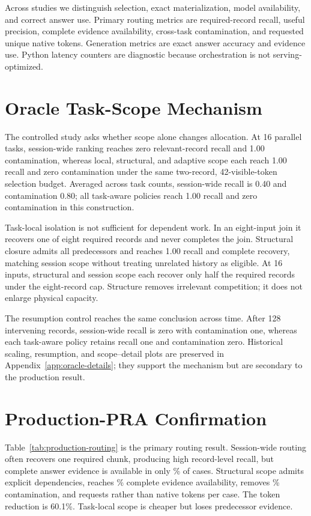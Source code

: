 \documentclass[10pt]{article}
\begin{document}
Across studies we distinguish selection, exact materialization, model availability, and correct answer use. Primary routing metrics are required-record recall, useful precision, complete evidence availability, cross-task contamination, and requested unique native tokens. Generation metrics are exact answer accuracy and evidence use. Python latency counters are diagnostic because orchestration is not serving-optimized.

\section{Oracle Task-Scope Mechanism}
The controlled study asks whether scope alone changes allocation. At 16 parallel tasks, session-wide ranking reaches zero relevant-record recall and 1.00 contamination, whereas local, structural, and adaptive scope each reach 1.00 recall and zero contamination under the same two-record, 42-visible-token selection budget. Averaged across task counts, session-wide recall is 0.40 and contamination 0.80; all task-aware policies reach 1.00 recall and zero contamination in this construction.

Task-local isolation is not sufficient for dependent work. In an eight-input join it recovers one of eight required records and never completes the join. Structural closure admits all predecessors and reaches 1.00 recall and complete recovery, matching session scope without treating unrelated history as eligible. At 16 inputs, structural and session scope each recover only half the required records under the eight-record cap. Structure removes irrelevant competition; it does not enlarge physical capacity.

The resumption control reaches the same conclusion across time. After 128 intervening records, session-wide recall is zero with contamination one, whereas each task-aware policy retains recall one and contamination zero. Historical scaling, resumption, and scope--detail plots are preserved in Appendix~\ref{app:oracle-details}; they support the mechanism but are secondary to the production result.

\section{Production-PRA Confirmation}
Table~\ref{tab:production-routing} is the primary routing result. Session-wide routing often recovers one required chunk, producing high record-level recall, but complete answer evidence is available in only \ProductionSessionEvidence\% of cases. Structural scope admits explicit dependencies, reaches \ProductionStructuralEvidence\% complete evidence availability, removes \ProductionSessionContamination\% contamination, and requests \ProductionStructuralNativeTokens{} rather than \ProductionSessionNativeTokens{} native tokens per case. The token reduction is 60.1\%. Task-local scope is cheaper but loses predecessor evidence.
\end{document}
